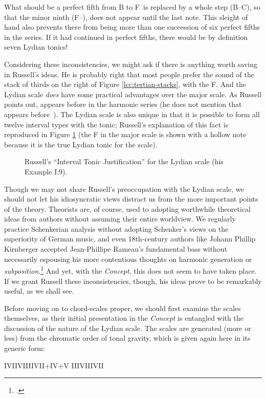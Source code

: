 \noindent What should be a perfect fifth from B to F\sharp\ is replaced by a
whole step (B--C\sharp), so that the minor ninth (F--\Gflat), does not appear
until the last note. This sleight of hand also prevents there from being more
than one succession of six perfect fifths in the series. If it had continued
in perfect fifths, there would be by definition seven Lydian tonics!

Considering these inconsistencies, we might ask if there is anything worth
saving in Russell's ideas. He is probably right that most people prefer the
sound of the stack of thirds on the right of Figure \ref{lcc:tertian-stacks},
with the F\sharp. And the Lydian scale \emph{does} have some
practical advantages over the major scale. As Russell points out, \sharp{}
appears before \nat{} in the harmonic series (he does not mention that
\flat{} appears before \nat{}\,). The Lydian scale is also unique in that
it is possible to form all twelve interval types with the tonic; Russell's
explanation of this fact is reproduced in Figure \ref{lcc:lydian-intervals}
(the F in the major scale is shown with a hollow note because it is the true
Lydian tonic for the scale).

\begin{figure}[tbp]
  \caption[Russell's ``Interval Tonic Justification'' for the Lydian
  scale.]{Russell's ``Interval Tonic Justification'' for the Lydian scale
    (his Example I:9).}
  \label{lcc:lydian-intervals}
\end{figure}

Though we may not share Russell's preoccupation with the Lydian scale, we
should not let his idiosyncratic views distract us from the more important
points of the theory. Theorists are, of course, used to adopting worthwhile
theoretical ideas from authors without assuming their entire worldview. We
regularly practice Schenkerian analysis without adopting Schenker's views on
the superiority of German music, and even 18th-century authors like Johann
Phillip Kirnberger accepted Jean-Phillipe Rameau's fundamental bass without
necessarily espousing his more contentious thoughts on harmonic generation or
\emph{subposition}.\footcite[240--41]{lester:1992} And yet, with the
\emph{Concept}, this does not seem to have taken place. If we grant
Russell these inconsistencies, though, his ideas prove to be remarkably
useful, as we shall see.

Before moving on to chord-scales proper, we should first examine the scales
themselves, as their initial presentation in the \emph{Concept} is entangled
with the discussion of the nature of the Lydian scale. The scales are
generated (more or less) from the chromatic order of tonal gravity, which is
given again here in its generic form: \\
{\centering I\quad V\quad II\quad VI\quad III\quad VII\quad +IV\quad +V\quad
  \flat{}III\quad \flat{}VII\quad IV\quad \flat{}II\quad \par}

